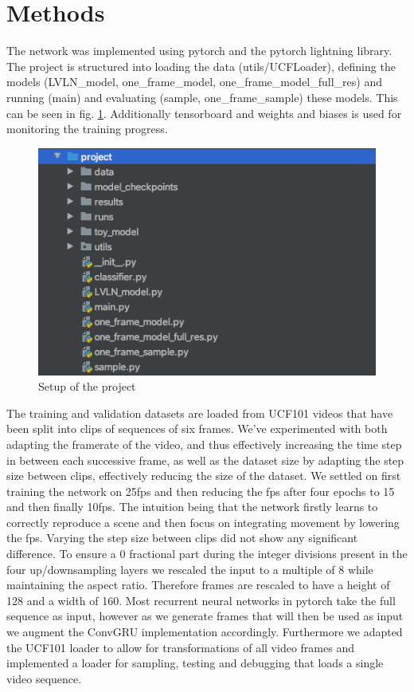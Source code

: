 \documentclass[runningheads,a4paper]{llncs}
\begin{document}
\clearpage
\section{Methods}
The network was implemented using pytorch and the pytorch lightning library. The project is structured into loading the data (utils/UCFLoader), defining the models (LVLN\_model, one\_frame\_model, one\_frame\_model\_full\_res) and running (main) and evaluating (sample, one\_frame\_sample) these models. This can be seen in fig. \ref{fig:project_setup}. Additionally tensorboard and weights and biases is used for monitoring the training progress.

\begin{figure}
\includegraphics[width=0.45\linewidth]{res/project_setup.png}
\caption{ Setup of the project }
\label{fig:project_setup}
\end{figure}

The training and validation datasets are loaded from UCF101 videos that have been split into clips of sequences of six frames. We’ve experimented with both adapting the framerate of the video, and thus effectively increasing the time step in between each successive frame, as well as the dataset size by adapting the step size between clips, effectively reducing the size of the dataset. We settled on first training the network on 25fps and then reducing the fps after four epochs to 15 and then finally 10fps. The intuition being that the network firstly learns to correctly reproduce a scene and then focus on integrating movement by lowering the fps. Varying the step size between clips did not show any significant difference. To ensure a 0 fractional part during the integer divisions present in the four up/downsampling layers we rescaled the input to a multiple of 8 while maintaining the aspect ratio. Therefore frames are rescaled to have a height of 128 and a width of 160.  Most recurrent neural networks in pytorch take the full sequence as input, however as we generate frames that will then be used as input we augment the ConvGRU implementation accordingly. Furthermore we adapted the UCF101 loader to allow for transformations of all video frames and implemented a loader for sampling, testing and debugging that loads a single video sequence.
\end{document}
